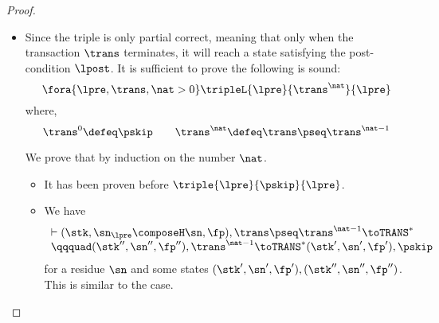\begin{proof}
\begin{itemize}
\item {}
Since the triple is only partial correct, 
meaning that only when the transaction \( \trans \) terminates, it will reach a state satisfying the post-condition \( \lpost \).
It is sufficient to prove the following is sound:
\[
    \fora{\lpre, \trans, \nat > 0} \tripleL{\lpre}{\trans^{\nat}}{\lpre}
\]
where,
\[
    \trans^{0} \defeq  \pskip \qquad
    \trans^{\nat} \defeq  \trans \pseq \trans^{\nat - 1} 
\]

We prove that by induction on the number \( \nat \).
\begin{itemize}
    \item {} It has been proven before \( \triple{\lpre}{\pskip}{\lpre} \).
    \item {} We have 
    \[ 
        \begin{array}{l}
        \vdash (\stk, \sn_\lpre \composeH \sn, \fp), \trans \pseq \trans^{\nat - 1} \toTRANS^{*} \\
        \qqquad (\stk'', \sn'', \fp''), \trans^{\nat - 1} \toTRANS^{*} (\stk', \sn', \fp'), \pskip  
        \end{array}
    \]
    for a residue \( \sn \) and some states \( ( \stk', \sn', \fp' ), ( \stk'', \sn'', \fp'' ) \).
    This is similar to the  case.
\end{itemize}


\end{itemize}
\end{proof}
